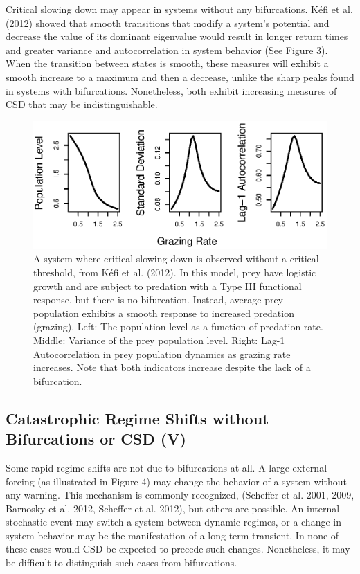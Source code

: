 \documentclass{article}
\begin{document}
Critical slowing down may appear in systems without any bifurcations.
Kéfi et al. (2012) showed that smooth transitions that modify a system's
potential and decrease the value of its dominant eigenvalue would result
in longer return times and greater variance and autocorrelation in
system behavior (See Figure 3). When the transition between states is
smooth, these measures will exhibit a smooth increase to a maximum and
then a decrease, unlike the sharp peaks found in systems with
bifurcations. Nonetheless, both exhibit increasing measures of CSD that
may be indistinguishable.

\begin{figure}[htbp]
\centering
\includegraphics{kefi-fig.eps}
\caption{A system where critical slowing down is observed without a
critical threshold, from Kéfi et al. (2012). In this model, prey have
logistic growth and are subject to predation with a Type III functional
response, but there is no bifurcation. Instead, average prey population
exhibits a smooth response to increased predation (grazing). Left: The
population level as a function of predation rate. Middle: Variance of
the prey population level. Right: Lag-1 Autocorrelation in prey
population dynamics as grazing rate increases. Note that both indicators
increase despite the lack of a bifurcation.}
\end{figure}

\subsection{Catastrophic Regime Shifts without Bifurcations or CSD (V)}

Some rapid regime shifts are not due to bifurcations at all. A large
external forcing (as illustrated in Figure 4) may change the behavior of
a system without any warning. This mechanism is commonly recognized,
(Scheffer et al. 2001, 2009, Barnosky et al. 2012, Scheffer et al.
2012), but others are possible. An internal stochastic event may switch
a system between dynamic regimes, or a change in system behavior may be
the manifestation of a long-term transient. In none of these cases would
CSD be expected to precede such changes. Nonetheless, it may be
difficult to distinguish such cases from bifurcations.
\end{document}
